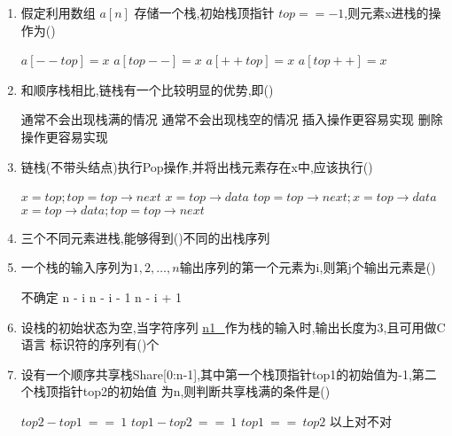 \documentclass[12pt, a4paper, oneside, UTF8]{ctexbook}
\begin{document}
\begin{enumerate}
    \item 假定利用数组 $a[n]$ 存储一个栈,初始栈顶指针 $top==-1$,则元素x进栈的操作为() 
    \begin{choices}
        \task $a[--top] = x$ 
        \task $a[top--] = x$
        \task $a[++top] = x$
        \task $a[top++] = x$
    \end{choices}

    \item 和顺序栈相比,链栈有一个比较明显的优势,即() 
    \begin{choices}[2]
        \task 通常不会出现栈满的情况 
        \task 通常不会出现栈空的情况 
        \task 插入操作更容易实现 
        \task 删除操作更容易实现 
    \end{choices}


    \item 链栈(不带头结点)执行Pop操作,并将出栈元素存在x中,应该执行() 
    \begin{choices}[2]
        \task $x=top;top=top\rightarrow next$ 
        \task $x=top\rightarrow data$ 
        \task $top=top\rightarrow next;x=top\rightarrow data$
        \task $x=top\rightarrow data;top=top\rightarrow next$ 
    \end{choices}

    \item 三个不同元素进栈,能够得到()不同的出栈序列 


    \item 一个栈的输入序列为$1,2,\ldots,n$输出序列的第一个元素为i,则第j个输出元素是() 
    \begin{choices}
        \task 不确定
        \task n - i 
        \task n - i - 1
        \task n - i + 1
    \end{choices}


    \item 设栈的初始状态为空,当字符序列 \underline{n1\_}作为栈的输入时,输出长度为3,且可用做C语言
    标识符的序列有()个
    \begin{choices}
    \end{choices}


    \item 设有一个顺序共享栈Share[0:n-1],其中第一个栈顶指针top1的初始值为-1,第二个栈顶指针top2的初始值
    为n,则判断共享栈满的条件是() 
    \begin{choices}[2]
        \task $top2-top1\ ==\ 1$
        \task $top1-top2\ ==\ 1$ 
        \task $top1\ ==\ top2$ 
        \task 以上对不对
    \end{choices}



\end{enumerate}
\end{document}
